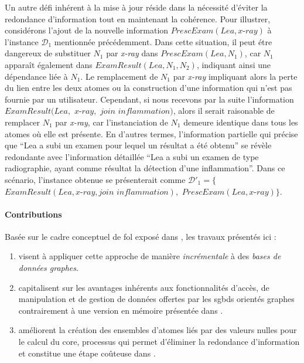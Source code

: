 Un autre défi inhérent à la mise à jour réside dans la nécessité d'éviter la redondance d'information tout en maintenant la cohérence.
Pour illustrer, considérons l'ajout de la nouvelle information $PrescExam(Lea, \textit{x-ray})$ à l'instance $\mathcal{D}_1$ mentionnée précédemment.
Dans cette situation, il peut étre dangereux de substituer $N_1$ par \textit{x-ray} dans $PrescExam(Lea, N_1)$, car $N_1$ apparaît également dans $ExamResult(Lea, N_1, N_2)$, indiquant ainsi une dépendance liée à $N_1$.
Le remplacement de $N_1$ par \textit{x-ray} impliquant alors la perte du lien entre les deux atomes ou la construction d'une information qui n'est pas fournie par un utilisateur.
Cependant, si nous recevons par la suite l'information $ExamResult(Lea,$ $\textit{x-ray},$ $\textit{join inflammation})$, alors il serait raisonable de remplacer $N_1$ par \textit{x-ray}, car l'instanciation de $N_1$ demeure identique dans tous les atomes où elle est présente.
En d'autres termes, l'information partielle qui précise que \enquote{Lea a subi un examen pour lequel un résultat a été obtenu} se révèle redondante avec l'information détaillée \enquote{Lea a subi un examen de type radiographie, ayant comme résultat la détection d'une inflammation}.
Dans ce scénario, l'instance obtenue se présenterait comme $\mathcal{D}'_1 = \{$$ExamResult(Lea, \textit{x-ray}, \textit{join inflammation}),$ $PrescExam(Lea, \textit{x-ray})\}$.

\paragraph{Contributions}
Basée sur le cadre conceptuel de \gls{fol} exposé dans \cite{chabinConsistentUpdatingDatabases2020}, les travaux présentés ici :
\begin{enumerate}
    \item visent à appliquer cette approche de manière \emph{incrémentale} à des \emph{bases de données graphes}.
    \item capitalisent sur les avantages inhérents aux fonctionnalités d'accès, de manipulation et de gestion de données offertes par les \glspl{sgbd} orientés graphes contrairement à une version en mémoire présentée dans \cite{chabinConsistentUpdatingDatabases2020}.
    \item améliorent la création des ensembles d'atomes liés par des valeurs nulles pour le calcul du \gls{core}, processus qui permet d'éliminer la redondance d'information et constitue une étape coûteuse dans \cite{chabinConsistentUpdatingDatabases2020}.
\end{enumerate}

